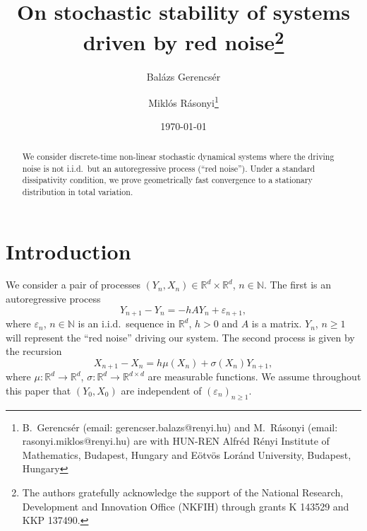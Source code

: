 \documentclass{article}
\begin{document}
\title{On stochastic stability of systems\\ driven by red noise\thanks{The authors gratefully acknowledge the support of 
the National Research, Development and Innovation Office (NKFIH) through grants K 143529 and KKP 137490.}}


\author{Bal\'azs Gerencs\'er \and Mikl\'os R\'asonyi\thanks{B.\ Gerencs\'er (email: gerencser.balazs@renyi.hu) and M.\ R\'asonyi (email: rasonyi.miklos@renyi.hu) are with HUN-REN Alfr\'ed R\'enyi Institute of Mathematics, Budapest, Hungary and E\"otv\"os Lor\'and{}
University, Budapest, Hungary }}


\date{\today}

\maketitle
{}

\begin{abstract}
We consider discrete-time non-linear stochastic dynamical systems where the driving noise is 
not i.i.d.\ but an autoregressive process (``red noise''). Under a standard dissipativity condition, 
we prove geometrically fast convergence to 
a stationary distribution in total variation. 
\end{abstract}

\section{Introduction}

We consider a pair of processes $(Y_{n},X_{n})\in\mathbb{R}^d\times\mathbb{R}^d$, $n\in\mathbb{N}$. The first 
is an autoregressive process
\begin{equation}\label{recursion0}
Y_{n+1}-Y_n=-hAY_{n}+\varepsilon_{n+1},
\end{equation}
where $\varepsilon_{n}$, $n\in\mathbb{N}$ is an i.i.d.\ sequence in $\mathbb{R}^{d}$, $h>0$ and $A$ is a matrix.
$Y_n$, $n\geq 1$ will represent the ``red noise'' driving our system. 
The second process is given by the recursion
\begin{equation}\label{recursion1}
X_{n+1}-X_{n}=h \mu(X_n)+\sigma(X_n)Y_{n+1},
\end{equation}
where $\mu:\mathbb{R}^d\to\mathbb{R}^d$, $\sigma:\mathbb{R}^d\to \mathbb{R}^{d\times d}$ are measurable functions. 
We assume throughout this paper that
$(Y_0,X_0)$ are independent of $(\varepsilon_n)_{n\geq 1}$.
\end{document}
